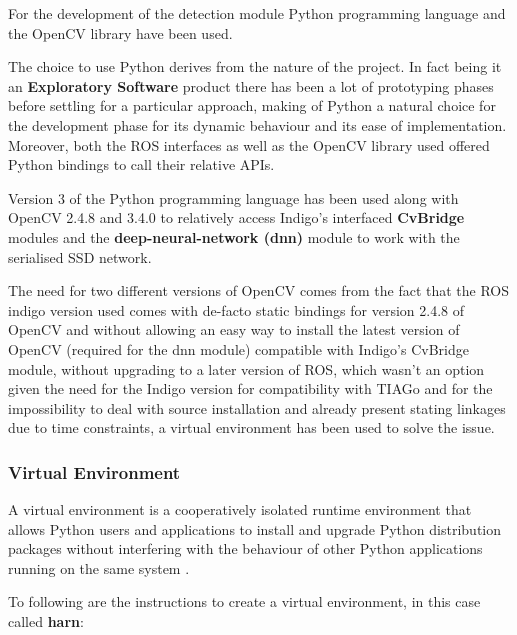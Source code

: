 For the development of the detection module Python programming language and the OpenCV library have been used.

The choice to use Python derives from the nature of the project. In fact being it an \textbf{Exploratory Software} product there has been a lot of prototyping phases before settling for a particular approach, making of Python a natural choice for the development phase for its dynamic behaviour and its ease of implementation. Moreover, both the ROS interfaces as well as the OpenCV library used offered Python bindings to call their relative APIs.

Version 3 of the Python programming language has been used along with OpenCV 2.4.8 and 3.4.0 to relatively access Indigo's interfaced \textbf{CvBridge} modules and the \textbf{deep-neural-network (dnn)} module to work with the serialised SSD network.

The need for two different versions of OpenCV comes from the fact that the ROS indigo version used comes with de-facto static bindings for version 2.4.8  of OpenCV and without allowing an easy way to install the latest version of OpenCV (required for the dnn module) compatible with Indigo's CvBridge module, without upgrading to a later version of ROS, which wasn't an option given the need for the Indigo version for compatibility with TIAGo and for the impossibility to deal with source installation and already present stating linkages due to time constraints, a virtual environment has been used to solve the issue.

\subsubsection{Virtual Environment}

A virtual environment is a cooperatively isolated runtime environment that allows Python users and applications to install and upgrade Python distribution packages without interfering with the behaviour of other Python applications running on the same system \cite{website:virtualEnv}.

To following are the instructions to create a virtual environment, in this case called \textbf{harn}:

